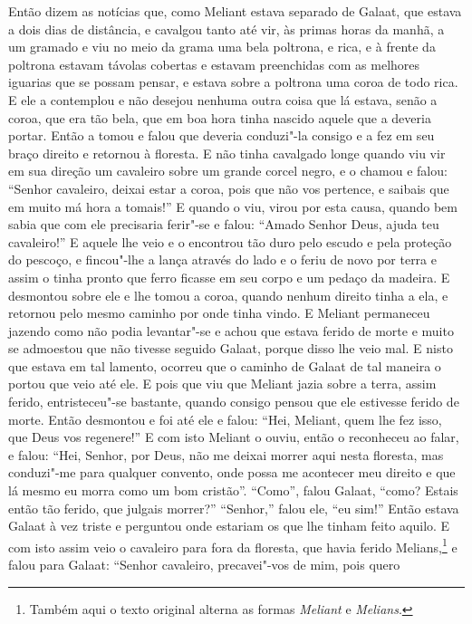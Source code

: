 Então dizem as notícias que, como Meliant estava separado de Galaat, que estava
a dois dias de distância, e cavalgou tanto até vir, às primas horas da manhã, a
um gramado e viu no meio da grama uma bela poltrona, e rica, e à frente da
poltrona estavam távolas cobertas e estavam preenchidas com as melhores
iguarias que se possam pensar, e estava sobre a poltrona uma coroa de todo
rica. E ele a contemplou e não desejou nenhuma outra coisa que lá estava, senão
a coroa, que era tão bela, que em boa hora tinha nascido aquele que a deveria
portar. Então a tomou e falou que deveria conduzi"-la consigo e a fez em seu
braço direito e retornou à floresta. E não tinha cavalgado longe quando viu vir
em sua direção um cavaleiro sobre um grande corcel negro, e o chamou e falou:
“Senhor cavaleiro, deixai estar a coroa, pois que não vos pertence, e saibais
que em muito má hora a tomais!” E quando o viu, virou por esta causa, quando
bem sabia que com ele precisaria ferir"-se e falou: “Amado Senhor Deus,
ajuda teu cavaleiro!” E aquele lhe veio e o encontrou tão duro pelo escudo e
pela proteção do pescoço, e fincou"-lhe a lança através do lado e o feriu de
novo por terra e assim o tinha pronto que ferro ficasse em seu corpo e um
pedaço da madeira. E desmontou sobre ele e lhe tomou a coroa, quando nenhum
direito tinha a ela, e retornou pelo mesmo caminho por onde tinha vindo. 
E Meliant permaneceu jazendo como não podia levantar"-se e achou que estava
ferido de morte e muito se admoestou que não tivesse seguido Galaat, porque
disso lhe veio mal. E nisto que estava em tal lamento, ocorreu que o caminho de
Galaat de tal maneira o portou que veio até ele. E pois que viu que Meliant
jazia sobre a terra, assim ferido, entristeceu"-se bastante, quando consigo
pensou que ele estivesse ferido de morte. Então desmontou e foi até ele e
falou: “Hei, Meliant, quem lhe fez isso, que Deus vos regenere!” E com isto
Meliant o ouviu, então o reconheceu ao falar, e falou: “Hei, Senhor, por Deus,
não me deixai morrer aqui nesta floresta, mas conduzi"-me para qualquer
convento, onde possa me acontecer meu direito e que lá mesmo eu morra como um
bom cristão”. “Como”, falou Galaat, “como? Estais então tão ferido, que julgais
morrer?” “Senhor,” falou ele, “eu sim!” Então estava Galaat à vez triste e
perguntou onde estariam os que lhe tinham feito aquilo. E com isto assim veio o
cavaleiro para fora da floresta, que havia ferido Melians,\footnote{ Também aqui
o texto original alterna as formas \textit{Meliant} e \textit{Melians}.
 } e falou para Galaat: “Senhor cavaleiro, precavei"-vos de mim, pois quero
